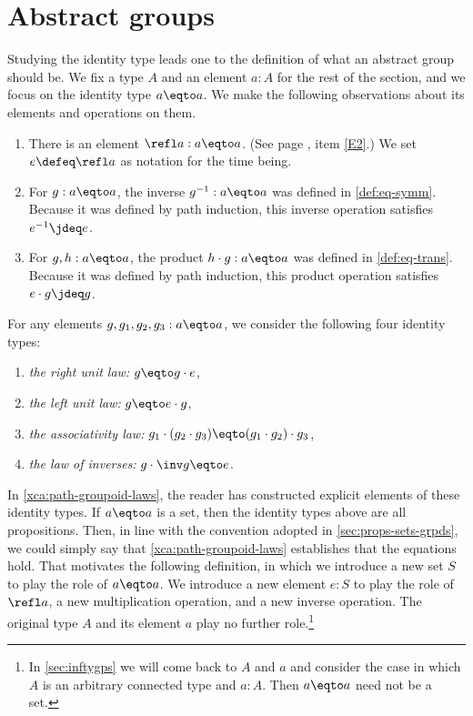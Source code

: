 \section{Abstract groups}
\label{sec:identity-type-as-abstract}

Studying the identity type leads one to the definition of what an 
abstract group should be. We fix a type $A$ and an element $a:A$ for the rest
of the section, and we focus on the identity type $a\eqto a$.
We make the following observations about its elements and operations on them.

\begin{enumerate}
\item
  There is an element $\refl a : a \eqto a$.
  (See page \pageref{rules-for-equality}, item \ref{E2}.)
  We set $e \defeq \refl a$ as notation for the time being.
\item
  For $g : a \eqto a$, the inverse $g^{-1} : a \eqto a$ was defined in \cref{def:eq-symm}.
  Because it was defined by path induction, this inverse operation satisfies $e^{-1} \jdeq e$.
\item
  For $g, h : a \eqto a$, the product $h \cdot g : a \eqto a$ was defined in \cref{def:eq-trans}.
  Because it was defined by path induction, this product operation satisfies $e \cdot g \jdeq g$.
\end{enumerate}

For any elements $g,g_1,g_2,g_3:a\eqto a$, we consider the 
following four identity types:
\begin{enumerate}
\item
  \label{it:right-unit} \emph{the right unit law:} $g \eqto g\cdot e$,
\item
  \label{it:left-unit} \emph{the left unit law:} $g \eqto e\cdot g$,
\item
  \label{it:associativity} \emph{the associativity law:} $g_1\cdot(g_2\cdot g_3)
  \eqto (g_1\cdot g_2)\cdot g_3$,
\item
  \label{it:inverse} \emph{the law of inverses:} $g\cdot \inv g \eqto e$.
\end{enumerate}

In \cref{xca:path-groupoid-laws}, the reader has constructed explicit
elements of these identity types. 
If $a\eqto a$ is a set, then the identity types
above are all propositions. Then, in line with the convention adopted 
in \cref{sec:props-sets-grpds}, we could simply say that
\cref{xca:path-groupoid-laws} establishes that the equations hold.
That motivates the following definition, 
in which we introduce a new set $S$ to play the role of $a\eqto a$.
We introduce a new element $e:S$ to play the role of $\refl a$, 
a new multiplication operation, and a new inverse operation. 
The original type $A$ and its element $a$ play no further role.\footnote{%
In \cref{sec:inftygps} we will come back to $A$ and $a$ and
consider the case in which $A$ is an arbitrary connected type
and $a:A$. Then $a\eqto a$ need not be a set.}

